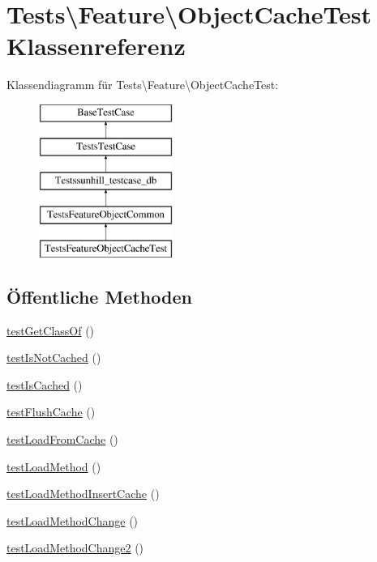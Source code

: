 \hypertarget{classTests_1_1Feature_1_1ObjectCacheTest}{}\section{Tests\textbackslash{}Feature\textbackslash{}Object\+Cache\+Test Klassenreferenz}
\label{classTests_1_1Feature_1_1ObjectCacheTest}
Klassendiagramm für Tests\textbackslash{}Feature\textbackslash{}Object\+Cache\+Test\+:\begin{figure}[H]
\begin{center}
\leavevmode
\includegraphics[height=5.000000cm]{df/d9c/classTests_1_1Feature_1_1ObjectCacheTest}
\end{center}
\end{figure}
\subsection*{Öffentliche Methoden}
\begin{DoxyCompactItemize}
\item 
\hyperlink{classTests_1_1Feature_1_1ObjectCacheTest_a674c225dd842fcbcd34a0ab135f7a1a8}{test\+Get\+Class\+Of} ()
\item 
\hyperlink{classTests_1_1Feature_1_1ObjectCacheTest_a37f2d2e2f33d83e9476a19e59360966e}{test\+Is\+Not\+Cached} ()
\item 
\hyperlink{classTests_1_1Feature_1_1ObjectCacheTest_a241ba3e8b20345c606e7e213c4c69fe9}{test\+Is\+Cached} ()
\item 
\hyperlink{classTests_1_1Feature_1_1ObjectCacheTest_afd0915dc9211790cf2fcbdcfd22ff17f}{test\+Flush\+Cache} ()
\item 
\hyperlink{classTests_1_1Feature_1_1ObjectCacheTest_a0ba0500b5864d59d6b050c8d11a92713}{test\+Load\+From\+Cache} ()
\item 
\hyperlink{classTests_1_1Feature_1_1ObjectCacheTest_ab8ae4d99538c075ccf81f6e275865426}{test\+Load\+Method} ()
\item 
\hyperlink{classTests_1_1Feature_1_1ObjectCacheTest_a005a4e4a722535895a2a6cff3960fc58}{test\+Load\+Method\+Insert\+Cache} ()
\item 
\hyperlink{classTests_1_1Feature_1_1ObjectCacheTest_ad99825eeb547f3e5d6f677f2833711c9}{test\+Load\+Method\+Change} ()
\item 
\hyperlink{classTests_1_1Feature_1_1ObjectCacheTest_a0268e51636b1e16a7300aec7bc6ad023}{test\+Load\+Method\+Change2} ()
\end{DoxyCompactItemize}
